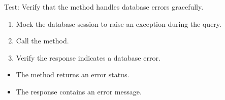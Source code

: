 \documentclass[letterpaper,10pt,english]{sphinxmanual}
\begin{document}

\begin{fulllineitems}
\label{\detokenize{test:test.test_residetnt.test_list_residents_in_room_database_error}}
\pysigstartsignatures
\pysiglinewithargsret
{}
{\sphinxparamcomma {}}
{}
\pysigstopsignatures
\sphinxAtStartPar
Test: Verify that the method handles database errors gracefully.
\begin{description}
\begin{enumerate}
%
\item {} 
\sphinxAtStartPar
Mock the database session to raise an exception during the query.

\item {} 
\sphinxAtStartPar
Call the  method.

\item {} 
\sphinxAtStartPar
Verify the response indicates a database error.

\end{enumerate}

\begin{itemize}
\item {} 
\sphinxAtStartPar
The method returns an error status.

\item {} 
\sphinxAtStartPar
The response contains an error message.

\end{itemize}

\end{description}

\end{fulllineitems}

\end{document}

